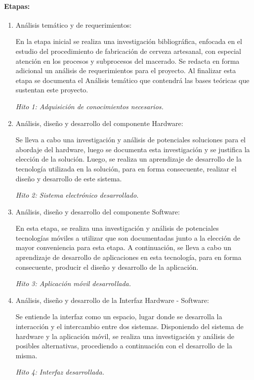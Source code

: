     \paragraph{Etapas:}
        \begin{enumerate}
            \item Análisis temático y de requerimientos:
                \par En la etapa inicial se realiza una investigación bibliográfica, enfocada en el estudio del procedimiento de fabricación de cerveza artesanal, con especial atención en los procesos y subprocesos del macerado. Se redacta en forma adicional un análisis de requerimientos para el proyecto. Al finalizar esta etapa se documenta el Análisis temático que contendrá las bases teóricas que sustentan este proyecto.
                \par \textit{Hito 1: Adquisición de conocimientos necesarios.}
                
            \item Análisis, diseño y desarrollo del componente Hardware:
                \par Se lleva a cabo una investigación y análisis de potenciales soluciones para el abordaje del hardware, luego se  documenta esta investigación y se justifica la elección de la solución. Luego, se realiza un aprendizaje de desarrollo de la tecnología utilizada en la solución, para en forma consecuente, realizar el diseño y desarrollo de este sistema.
                \par \textit{Hito 2: Sistema electrónico desarrollado.} 
                
            \item Análisis, diseño y desarrollo del componente Software:
                \par En esta etapa, se realiza una investigación y análisis de potenciales tecnologías móviles a utilizar que son documentadas junto a la elección de mayor conveniencia para esta etapa. A continuación, se lleva a cabo un aprendizaje de desarrollo de aplicaciones en esta tecnología, para en forma consecuente, producir el diseño y desarrollo de la aplicación.
                \par \textit{Hito 3: Aplicación móvil desarrollada.}
                
            \item Análisis, diseño y desarrollo de la Interfaz Hardware - Software:
                \par Se entiende la interfaz como un espacio, lugar donde se desarrolla la interacción y el intercambio entre dos sistemas. Disponiendo del sistema de hardware y la aplicación móvil, se realiza una investigación y análisis de posibles alternativas, procediendo a continuación con el desarrollo de la misma.
                \par \textit{Hito 4: Interfaz desarrollada.}
                

\end{enumerate}
